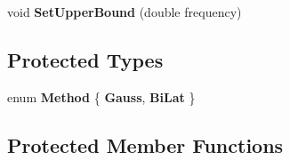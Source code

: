 \begin{DoxyCompactItemize}
\item 
\hypertarget{class_mode_track_a7b7a1977d0cdacf2533581c82707e018}{void {\bfseries Set\-Upper\-Bound} (double frequency)}\label{class_mode_track_a7b7a1977d0cdacf2533581c82707e018}

\end{DoxyCompactItemize}
\subsection*{Protected Types}
\begin{DoxyCompactItemize}
\item 
enum {\bfseries Method} \{ {\bfseries Gauss}, 
{\bfseries Bi\-Lat}
 \}
\end{DoxyCompactItemize}
\subsection*{Protected Member Functions}
